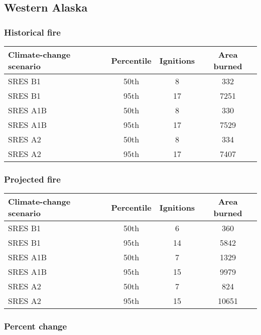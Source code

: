\documentclass{article}\usepackage[]{graphicx}\usepackage[]{color}
\newcommand{\headcol}{\rowcolor{tableheadcolor}}
\begin{document}
\newpage
\subsection{Western Alaska}
\subsubsection{Historical fire}

\begin{table}[ht]
\centering
\begin{tabular}{lccc}
  \headcol 
 \toprule
Climate-change scenario & Percentile & Ignitions & Area burned \\ 
  \midrule
SRES B1 & 50th & 8 & 332 \\ 
  SRES B1 & 95th & 17 & 7251 \\ 
  SRES A1B & 50th & 8 & 330 \\ 
  SRES A1B & 95th & 17 & 7529 \\ 
  SRES A2 & 50th & 8 & 334 \\ 
  SRES A2 & 95th & 17 & 7407 \\ 
   \bottomrule
\end{tabular}
\end{table}


\subsubsection{Projected fire}

\begin{table}[ht]
\centering
\begin{tabular}{lccc}
  \headcol 
 \toprule
Climate-change scenario & Percentile & Ignitions & Area burned \\ 
  \midrule
SRES B1 & 50th & 6 & 360 \\ 
  SRES B1 & 95th & 14 & 5842 \\ 
  SRES A1B & 50th & 7 & 1329 \\ 
  SRES A1B & 95th & 15 & 9979 \\ 
  SRES A2 & 50th & 7 & 824 \\ 
  SRES A2 & 95th & 15 & 10651 \\ 
   \bottomrule
\end{tabular}
\end{table}


\subsubsection{Percent change}
\end{document}
